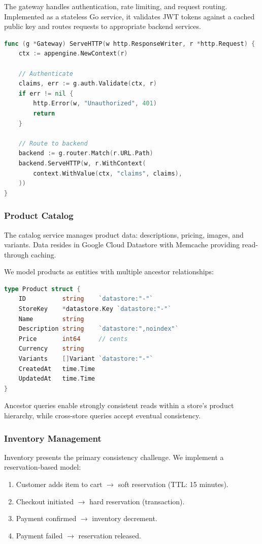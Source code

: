 \documentclass[11pt,twocolumn]{article}
\begin{document}
The gateway handles authentication, rate limiting, and request routing. Implemented as a stateless Go service, it validates JWT tokens against a cached public key and routes requests to appropriate backend services.

\begin{lstlisting}[language=Go,caption=Request routing]
func (g *Gateway) ServeHTTP(w http.ResponseWriter, r *http.Request) {
    ctx := appengine.NewContext(r)

    // Authenticate
    claims, err := g.auth.Validate(ctx, r)
    if err != nil {
        http.Error(w, "Unauthorized", 401)
        return
    }

    // Route to backend
    backend := g.router.Match(r.URL.Path)
    backend.ServeHTTP(w, r.WithContext(
        context.WithValue(ctx, "claims", claims),
    ))
}
\end{lstlisting}

\subsubsection{Product Catalog}

The catalog service manages product data: descriptions, pricing, images, and variants. Data resides in Google Cloud Datastore with Memcache providing read-through caching.

We model products as entities with multiple ancestor relationships:

\begin{lstlisting}[language=Go,caption=Product entity model]
type Product struct {
    ID          string    `datastore:"-"`
    StoreKey    *datastore.Key `datastore:"-"`
    Name        string
    Description string    `datastore:",noindex"`
    Price       int64     // cents
    Currency    string
    Variants    []Variant `datastore:"-"`
    CreatedAt   time.Time
    UpdatedAt   time.Time
}
\end{lstlisting}

Ancestor queries enable strongly consistent reads within a store's product hierarchy, while cross-store queries accept eventual consistency.

\subsubsection{Inventory Management}

Inventory presents the primary consistency challenge. We implement a reservation-based model:

\begin{enumerate}
\item Customer adds item to cart $\rightarrow$ soft reservation (TTL: 15 minutes).
\item Checkout initiated $\rightarrow$ hard reservation (transaction).
\item Payment confirmed $\rightarrow$ inventory decrement.
\item Payment failed $\rightarrow$ reservation released.
\end{enumerate}
\end{document}
